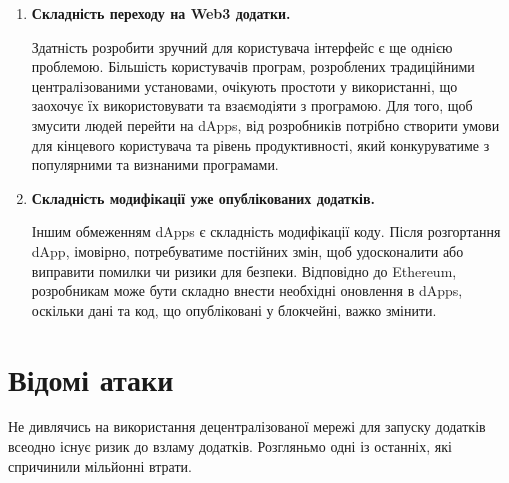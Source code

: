 \begin{itemize}
\begin{enumerate}
            \item \textbf{Складність переходу на Web3 додатки.}

            Здатність розробити зручний для користувача інтерфейс є ще однією проблемою. Більшість користувачів програм, розроблених традиційними централізованими установами, очікують простоти у використанні, що заохочує їх використовувати та взаємодіяти з програмою. Для того, щоб змусити людей перейти на dApps, від розробників потрібно створити умови для кінцевого користувача та рівень продуктивності, який конкуруватиме з популярними та визнаними програмами.
           
            \item \textbf{Складність модифікації уже опублікованих додатків.}

            Іншим обмеженням dApps є складність модифікації коду. Після розгортання dApp, імовірно, потребуватиме постійних змін, щоб удосконалити або виправити помилки чи ризики для безпеки. Відповідно до Ethereum, розробникам може бути складно внести необхідні оновлення в dApps, оскільки дані та код, що опубліковані у блокчейні, важко змінити.
        \end{enumerate}
\end{itemize}


\section{Відомі атаки}

Не дивлячись на використання децентралізованої мережі для запуску додатків всеодно існує ризик до взламу додатків. Розгляньмо одні із останніх, які спричинили мільйонні втрати.

